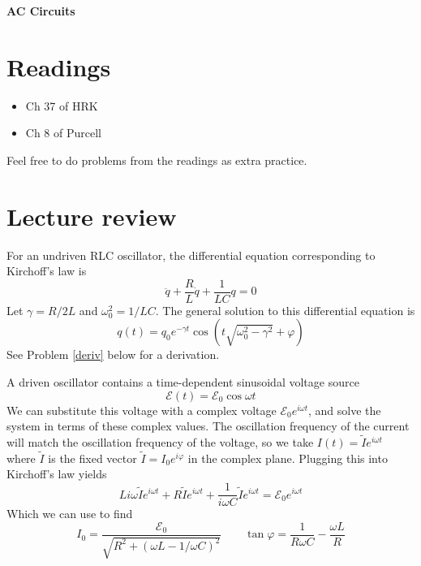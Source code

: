 \documentclass[11pt]{scrartcl}
\title{\titlee}
\author{Cambridge Physics Academy}
\date{2023-2024}
\newcommand{\titlee}{AC Circuits}
\begin{document}
\thispagestyle{empty}
\begin{center}
    
    
    \Huge \textbf{\textsf{\titlee}}

    \large \theauthor
\end{center}

\setcounter{section}{-1}
\section{Readings}
\begin{itemize}
    \item Ch 37 of HRK
    \item Ch 8 of Purcell
\end{itemize}
Feel free to do problems from the readings as extra practice.


\section{Lecture review}

\begin{theorem}\label{undriv}
    For an undriven RLC oscillator, the differential equation corresponding to Kirchoff's law is $$\ddot q+\frac{R}{L}\dot q+\frac{1}{LC}q=0$$ Let $\gamma=R/2L$ and $\omega_0^2=1/LC$. The general solution to this differential equation is  $$q(t)=q_0e^{-\gamma t}\cos(t\sqrt{\omega_0^2-\gamma^2}+\varphi)$$ See Problem \ref{deriv} below for a derivation.
\end{theorem}

\begin{theorem}\label{driven}
    A driven oscillator contains a time-dependent sinusoidal voltage source $$\mathcal E(t)=\mathcal E_0\cos\omega t$$ We can substitute this voltage with a complex voltage $\mathcal E_0e^{i\omega t}$, and solve the system in terms of these complex values. The oscillation frequency of the current will match the oscillation frequency of the voltage, so we take $I(t)=\tilde Ie^{i\omega t}$ where $\tilde I$ is the fixed vector $\tilde I=I_0e^{i\varphi}$ in the complex plane. Plugging this into Kirchoff's law yields $$Li\omega\tilde Ie^{i\omega t}+R\tilde Ie^{i\omega t}+\frac{1}{i\omega C}\tilde Ie^{i\omega t}=\mathcal E_0e^{i\omega t}$$Which we can use to find $$I_0=\frac{\mathcal E_0}{\sqrt{R^2+(\omega L-1/\omega C)^2}}\qquad \tan\varphi=\frac{1}{R\omega C}-\frac{\omega L}{R}$$
\end{theorem}
\end{document}
